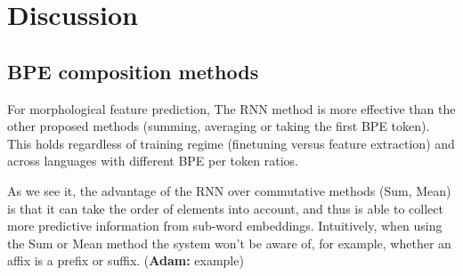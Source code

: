\documentclass[11pt]{article}
\newcommand\jp[1]{(\textbf{JP:} #1)}
\newcommand\adam[1]{(\textbf{Adam:} #1)}
\begin{document}
\begin{figure}
	\end{figure}

	
	
	\section{Discussion}

    \subsection{BPE composition methods}
    For morphological feature
     prediction, The RNN method is more
     effective than the other proposed methods (summing, averaging or
     taking the first BPE token). This holds regardless of training regime
     (finetuning versus feature extraction) and across languages with
     different BPE per token ratios.
    
     As we see it, the advantage of the RNN over commutative methods
     (Sum, Mean) is that it can take the order of elements into
     account, and thus is able to collect more predictive information from
     sub-word embeddings.
         Intuitively, when using the Sum or Mean method the system won't
     be aware of, for example, whether an affix is a prefix or suffix. \adam{example}

    
\end{document}
